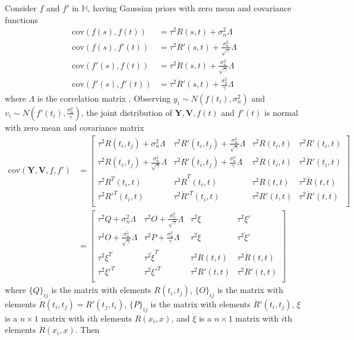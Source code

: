 Consider $f$ and $f'$ in $\mathbb{H}$, having Gaussian priors with zero mean and covariance functions
\begin{align*}
\text{cov}(f(s),f(t))&=\tau^2 R(s,t)+\sigma_n^2\Lambda\\
\text{cov}(f(s),f'(t))&=\tau^2 R'(s,t)+\frac{\sigma_n^2}{\sqrt{\gamma}}\Lambda\\
\text{cov}(f'(s),f(t))&=\tau^2 \dot{R}(s,t)+\frac{\sigma_n^2}{\sqrt{\gamma}}\Lambda\\
\text{cov}(f'(s),f'(t))&=\tau^2 \dot{R}'(s,t)+\frac{\sigma_n^2}{\gamma}\Lambda
\end{align*}
where $\Lambda$ is the correlation matrix . Observing $y_i \sim N(f(t_i),\sigma_n^2)$ and $v_i \sim N(f'(t_i),\frac{\sigma_n^2}{\gamma})$, the joint distribution of $\mathbf{Y}, \mathbf{V}, f(t)$ and $f'(t)$ is normal with zero mean and covariance matrix
\begin{align*}
\text{cov}(\mathbf{Y},\mathbf{V},f,f') &= 
\left[ \begin{matrix}
\tau^2R(t_i,t_j)+\sigma_n^2\Lambda & \tau^2R'(t_i,t_j)+\frac{\sigma_n^2}{\sqrt{\gamma}}\Lambda & \tau^2R(t_i,t)& \tau^2R'(t_i,t) \\
\tau^2 \dot{R}(t_i,t_j)+\frac{\sigma_n^2}{\sqrt{\gamma}}\Lambda & \tau^2 \dot{R}'(t_i,t_j)+\frac{\sigma_n^2}{\gamma}\Lambda & \tau^2 \dot{R}(t_i,t)& \tau^2\dot{R}'(t_i,t)  \\
\tau^2R^T(t_i,t) & \tau^2\dot{R}^T(t_i,t) & \tau^2R(t,t)& \tau^2\dot{R}(t,t) \\
 \tau^2R'^T(t_i,t)& \tau^2\dot{R}'^T(t_i,t)& \tau^2R'(t,t)& \tau^2\dot{R}'(t,t)  \\
\end{matrix} \right] \\
&=
\left[ \begin{matrix}
\tau^2Q+\sigma_n^2\Lambda & \tau^2 O+\frac{\sigma_n^2}{\sqrt{\gamma}}\Lambda & \tau^2\xi & \tau^2\xi' \\
\tau^2 O+\frac{\sigma_n^2}{\sqrt{\gamma}}\Lambda & \tau^2 P+\frac{\sigma_n^2}{\gamma}\Lambda & \tau^2 \dot{\xi}& \tau^2\dot{\xi}' \\
\tau^2\xi^T & \tau^2\dot{\xi}^T & \tau^2R(t,t)& \tau^2\dot{R}(t,t) \\
 \tau^2\xi'^T& \tau^2\dot{\xi}'^T& \tau^2R'(t,t)& \tau^2\dot{R}'(t,t)  \\
\end{matrix} \right]
\end{align*}
where $\{Q\}_{ij}$ is the matrix with elements $R(t_i,t_j)$,  $\{O\}_{ij}$ is the matrix with elements $\dot{R}(t_i,t_j)=R'(t_j,t_i)$,  $\{P\}_{ij}$ is the matrix with elements $\dot{R}'(t_i,t_j)$, $\xi$ is a $n \times 1$ matrix with $i$th elements $R(x_i,x)$, and $\dot{\xi}$ is a $n \times 1$ matrix with $i$th elements $\dot{R}(x_i,x)$. Then
